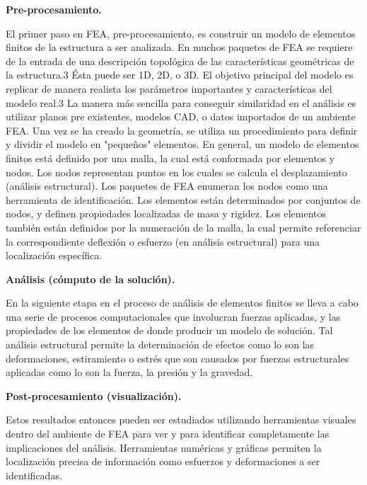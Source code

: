 \documentclass[a4paper,10pt]{article}
\begin{document}
\hfill

\textbf{Pre-procesamiento.}

\hfill

El primer paso en FEA, pre-procesamiento, es construir un modelo de elementos finitos de la estructura a ser analizada. En muchos paquetes de FEA se requiere de la entrada de una descripción topológica de las características geométricas de la estructura.3​ Ésta puede ser 1D, 2D, o 3D. El objetivo principal del modelo es replicar de manera realista los parámetros importantes y características del modelo real.3​ La manera más sencilla para conseguir similaridad en el análisis es utilizar planos pre existentes, modelos CAD, o datos importados de un ambiente FEA. Una vez se ha creado la geometría, se utiliza un procedimiento para definir y dividir el modelo en "pequeños" elementos. En general, un modelo de elementos finitos está definido por una malla, la cual está conformada por elementos y nodos. Los nodos representan puntos en los cuales se calcula el desplazamiento (análisis estructural). Los paquetes de FEA enumeran los nodos como una herramienta de identificación. Los elementos están determinados por conjuntos de nodos, y definen propiedades localizadas de masa y rigidez. Los elementos también están definidos por la numeración de la malla, la cual permite referenciar la correspondiente deflexión o esfuerzo (en análisis estructural) para una localización específica.

\hfill

\textbf{Análisis (cómputo de la solución).}

\hfill

En la siguiente etapa en el proceso de análisis de elementos finitos se lleva a cabo una serie de procesos computacionales que involucran fuerzas aplicadas, y las propiedades de los elementos de donde producir un modelo de solución. Tal análisis estructural permite la determinación de efectos como lo son las deformaciones, estiramiento o estrés que son causados por fuerzas estructurales aplicadas como lo son la fuerza, la presión y la gravedad.

\hfill

\textbf{Post-procesamiento (visualización).}

\hfill

Estos resultados entonces pueden ser estudiados utilizando herramientas visuales dentro del ambiente de FEA para ver y para identificar completamente las implicaciones del análisis. Herramientas numéricas y gráficas permiten la localización precisa de información como esfuerzos y deformaciones a ser identificadas.
\end{document}
